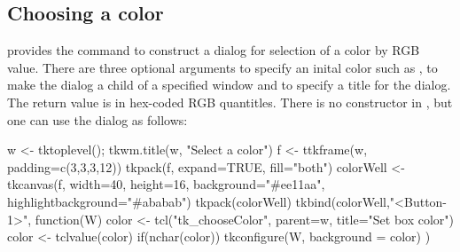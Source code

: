\subsection{Choosing a color}
\Tk\/ provides the command  to construct a dialog for selection of a color by RGB value. There are three optional arguments  to specify an inital color such as ,  to make the dialog a child of a specified window and  to specify a title for the dialog. The return value is in hex-coded RGB quantitles. 
There is no constructor in , but one can use the dialog as follows:
\begin{Schunk}
\begin{Sinput}
 w <- tktoplevel(); tkwm.title(w, "Select a color")
 f <- ttkframe(w, padding=c(3,3,3,12))
 tkpack(f, expand=TRUE, fill="both")
 colorWell <- tkcanvas(f, width=40, height=16, 
                       background="#ee11aa",
                       highlightbackground="#ababab") 
 tkpack(colorWell)
 tkbind(colorWell,"<Button-1>", function(W) {
   color <- tcl("tk_chooseColor", parent=w, title="Set box color")
   color <- tclvalue(color)
   if(nchar(color))
     tkconfigure(W, background = color)
 })
\end{Sinput}
\end{Schunk}


